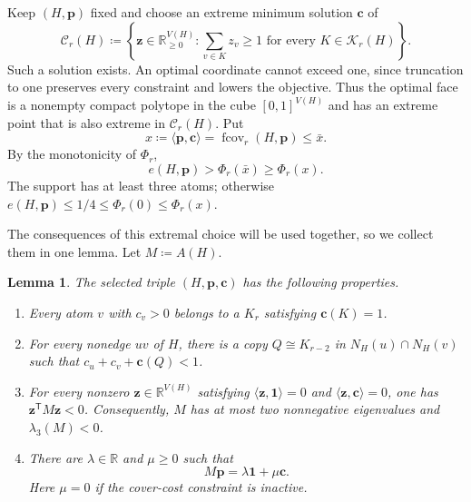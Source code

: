 \documentclass[10pt]{article}
\numberwithin{equation}{section}
\newtheorem{lemma}[lemma]{Lemma}
\newcommand{\fcov}{\operatorname{fcov}}
\newcommand{\one}{\mathbf 1}
\newcommand{\vct}[1]{\boldsymbol{#1}}
\newcommand{\R}{\mathbb R}
\begin{document}
Keep $(H,\vct p)$ fixed and choose an extreme minimum solution $\vct c$ of
\[
 \mathcal C_r(H)\coloneqq\left\{\vct z\in\R_{\ge0}^{V(H)}\colon
 \sum_{v\in K}z_v\ge1
 \text{ for every }K\in\mathcal K_r(H)\right\}.
\]
Such a solution exists.  An optimal coordinate cannot exceed one, since truncation to one preserves every constraint and lowers the objective.  Thus the optimal face is a nonempty compact polytope in the cube $[0,1]^{V(H)}$ and has an extreme point that is also extreme in $\mathcal C_r(H)$.  Put
\[
 x\coloneqq\langle\vct p,\vct c\rangle=\fcov_r(H,\vct p)\le\bar x.
\]
By the monotonicity of $\Phi_r$,
\begin{equation}\label{eq:strict-weighted-counterexample}
 e(H,\vct p)>\Phi_r(\bar x)\ge \Phi_r(x).
\end{equation}
The support has at least three atoms; otherwise $e(H,\vct p)\le1/4\le \Phi_r(0)\le \Phi_r(x)$.

The consequences of this extremal choice will be used together, so we collect them in one lemma.  Let $M\coloneqq A(H)$.

\begin{lemma}\label{lem:extremal-properties}
The selected triple $(H,\vct p,\vct c)$ has the following properties.
\begin{enumerate}[label=\textup{(\roman*)}]
\item Every atom $v$ with $c_v>0$ belongs to a $K_r$ satisfying $\vct c(K)=1$.
\item For every nonedge $uv$ of $H$, there is a copy $Q\cong K_{r-2}$ in $N_H(u)\cap N_H(v)$ such that $c_u+c_v+\vct c(Q)<1$. 
\item For every nonzero $\vct z\in\R^{V(H)}$ satisfying $\langle\vct z,\one\rangle=0$ and $\langle\vct z,\vct c\rangle=0$, one has $\vct z^{\mathsf T}M\vct z<0$.  Consequently, $M$ has at most two nonnegative eigenvalues and $\lambda_3(M)<0$.
\item There are $\lambda\in\R$ and $\mu\ge0$ such that
\begin{equation}\label{eq:weighted-stationarity}
 M\vct p=\lambda\one+\mu\vct c.
\end{equation}
Here $\mu=0$ if the cover-cost constraint is inactive.
\end{enumerate}
\end{lemma}
\end{document}

